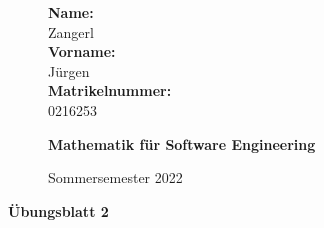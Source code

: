 \documentclass[10pt,ngerman]{scrartcl}
\begin{document}
\begin{figure}[htbp]
\begin{minipage}[b]{0.50\linewidth}
\begin{Large}
	
	\textbf{Name:}\\
	Zangerl 			\\
	\textbf{Vorname:}\\
	Jürgen 				\\
	\textbf{Matrikelnummer:}\\
	0216253
	
\end{Large}
\end{minipage}
\begin{minipage}[b]{0.50\linewidth}
\begin{flushright}
\begin{Huge}
\textbf{Mathematik für Software Engineering}\\
\end{Huge}
\vspace{10px}
\begin{large}
Sommersemester 2022
\end{large}
\end{flushright}
\end{minipage}
\end{figure}

\vspace{20px}
\begin{huge}
\noindent

\textbf{Übungsblatt 2}
\end{huge}

\end{document}

